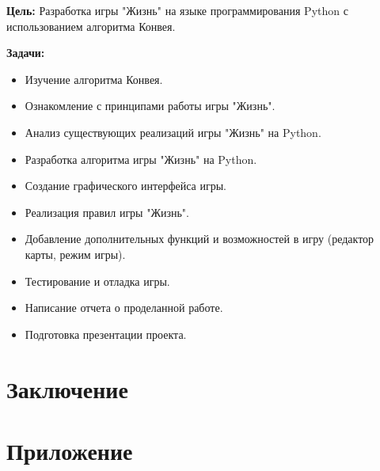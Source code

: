 \documentclass[14pt, oneside]{altsu-report}
\begin{document}
\textbf{Цель:} Разработка игры "Жизнь" на языке программирования Python с использованием алгоритма Конвея.

\textbf{Задачи:}
\begin{itemize}
    \item Изучение алгоритма Конвея.
    \item Ознакомление с принципами работы игры "Жизнь".
    \item Анализ существующих реализаций игры "Жизнь" на Python.
    \item Разработка алгоритма игры "Жизнь" на Python.
    \item Создание графического интерфейса игры.
    \item Реализация правил игры "Жизнь".
    \item Добавление дополнительных функций и возможностей в игру (редактор карты, режим игры).
    \item Тестирование и отладка игры.
    \item Написание отчета о проделанной работе.
    \item Подготовка презентации проекта.
\end{itemize}





\chapter*{Заключение}

\newpage
{}
\printbibliography[title={Список использованной литературы}]
\nocite{*}

\appendix
\newpage
\chapter*{\raggedleft\label{appendix1}Приложение}

\begin{center}
\label{code:appendix}
\end{center}

\begin{code}

\end{code}
\end{document}
